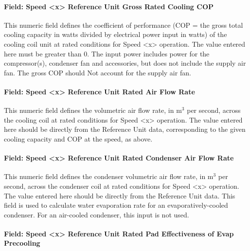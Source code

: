 \paragraph{Field: Speed \textless{}x\textgreater{} Reference Unit Gross Rated Cooling COP}\label{field-speed-x-reference-unit-gross-rated-cooling-cop}

This numeric field defines the coefficient of performance (COP = the gross total cooling capacity in watts divided by electrical power input in watts) of the cooling coil unit at rated conditions for Speed \textless{}x\textgreater{} operation. The value entered here must be greater than 0. The input power includes power for the compressor(s), condenser fan and accessories, but does not include the supply air fan. The gross COP should Not account for the supply air fan.

\paragraph{Field: Speed \textless{}x\textgreater{} Reference Unit Rated Air Flow Rate}\label{field-speed-x-reference-unit-rated-air-flow-rate}

This numeric field defines the volumetric air flow rate, in m\(^{3}\) per second, across the cooling coil at rated conditions for Speed \textless{}x\textgreater{} operation. The value entered here should be directly from the Reference Unit data, corresponding to the given cooling capacity and COP at the speed, as above.

\paragraph{Field: Speed \textless{}x\textgreater{} Reference Unit Rated Condenser Air Flow Rate}\label{field-speed-x-reference-unit-rated-condenser-air-flow-rate}

This numeric field defines the condenser volumetric air flow rate, in m\(^{3}\) per second, across the condenser coil at rated conditions for Speed \textless{}x\textgreater{} operation. The value entered here should be directly from the Reference Unit data. This field is used to calculate water evaporation rate for an evaporatively-cooled condenser. For an air-cooled condenser, this input is not used.

\paragraph{Field: Speed \textless{}x\textgreater{} Reference Unit Rated Pad Effectiveness of Evap Precooling}\label{field-speed-x-reference-unit-rated-pad-effectiveness-of-evap-precooling}

